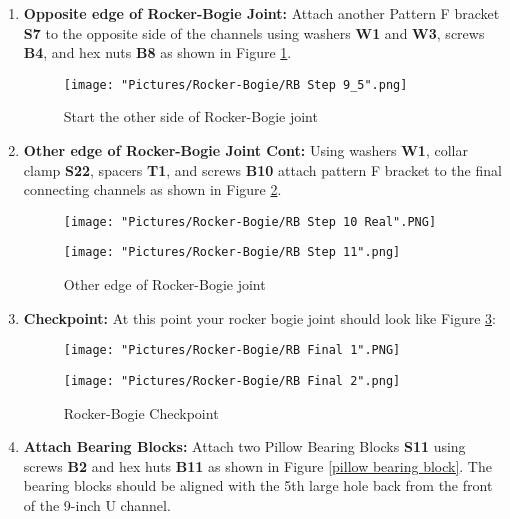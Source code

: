 \documentclass[12pt]{article}
\begin{document}
\begin{enumerate}
\item \textbf{Opposite edge of Rocker-Bogie Joint:} Attach another Pattern F bracket \textbf{S7} to the opposite side of the channels using washers \textbf{W1} and \textbf{W3}, screws \textbf{B4}, and hex nuts \textbf{B8} as shown in Figure \ref{start other edge rocker bogie}.

\begin{figure}[H]
	\centering
	\texttt{[image: "Pictures/Rocker-Bogie/RB Step 9\_5".png]}
	\caption{Start the other side of Rocker-Bogie joint}
	\label{start other edge rocker bogie}
\end{figure}

\item \textbf{Other edge of Rocker-Bogie Joint Cont: } Using washers \textbf{W1}, collar clamp \textbf{S22},  spacers \textbf{T1}, and screws \textbf{B10} attach pattern F bracket to the final connecting channels as shown in Figure \ref{other edge rocker bogie}.

\begin{figure}[H]
  \centering
  \begin{minipage}[b]{0.45\textwidth}
    \texttt{[image: "Pictures/Rocker-Bogie/RB Step 10 Real".PNG]}
  \end{minipage}
  \hfill
  \begin{minipage}[b]{0.45\textwidth}
    \texttt{[image: "Pictures/Rocker-Bogie/RB Step 11".png]}
  \end{minipage}
  \caption{Other edge of Rocker-Bogie joint}
  \label{other edge rocker bogie}
\end{figure}

\item \textbf{Checkpoint:} At this point your rocker bogie joint should look like Figure \ref{checkpoint}:

\begin{figure}[H]
  \centering
  \begin{minipage}[b]{0.45\textwidth}
    \texttt{[image: "Pictures/Rocker-Bogie/RB Final 1".PNG]}
  \end{minipage}
  \hfill
  \begin{minipage}[b]{0.45\textwidth}
    \texttt{[image: "Pictures/Rocker-Bogie/RB Final 2".png]}
  \end{minipage}
  \caption{Rocker-Bogie Checkpoint}
  \label{checkpoint}
\end{figure}

\item \textbf{Attach Bearing Blocks:} Attach two Pillow Bearing Blocks \textbf{S11} using screws \textbf{B2} and hex huts \textbf{B11} as shown in Figure \ref{pillow bearing block}. The bearing blocks should be aligned with the 5th large hole back from the front of the 9-inch U channel.


\end{enumerate}
\end{document}
